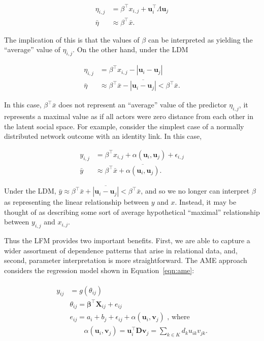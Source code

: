 \documentclass[12pt,twocolumn,twoside]{pnas-new}
\begin{document}
\begin{align*}
	\eta_{i,j} & =  \beta^\top x_{i,j} + \textbf{u}_{i}^{\top} \Lambda \textbf{u}_{j} \\
	\bar \eta & \approx  \beta^\top \bar x.
\end{align*}

The implication of this is that the values of $\beta$ can be interpreted as yielding the ``average'' value of $\eta_{i,j}$. On the other hand, under the LDM

\begin{align*}
	\eta_{i,j} & =  \beta^\top x_{i,j} - |\textbf{u}_{i} - \textbf{u}_{j}|  \\
	\bar \eta & \approx  \beta^\top \bar x - \overline{ |\textbf{u}_{i} - \textbf{u}_{j}| } <  \beta^\top \bar x .
\end{align*}

In this case, $\beta^\top \bar x$ does not represent an ``average'' value of the predictor $\eta_{i,j}$, it represents a maximal value as if all actors were zero distance from each other in the latent social space. For example, consider the simplest case of a normally distributed network  outcome with an identity link. In this case,

\begin{align*}
	y_{i,j} & = \beta^\top x_{i,j} + \alpha(\textbf{u}_{i}, \textbf{u}_{j}) + \epsilon_{i,j} \\
	\bar y & \approx \beta^\top \bar x + \overline{ \alpha(\textbf{u}_{i}, \textbf{u}_{j}) }   .
\end{align*}

Under the LDM, $\bar y \approx \beta^\top \bar x + \overline{ |\textbf{u}_{i} - \textbf{u}_{j}|  } < \beta^\top \bar x$, and so we no longer can interpret $\beta$ as representing the linear relationship between $y$ and $x$. Instead, it may be thought of as describing some sort of average hypothetical ``maximal'' relationship between $y_{i,j}$ and $x_{i,j}$.

Thus the LFM provides two important benefits. First, we are able to capture a wider assortment of dependence patterns that arise in relational data, and, second, parameter interpretation is more straightforward. The AME approach considers the regression model shown in Equation~\ref{eqn:ame}:

\begin{align}
\begin{aligned}
	y_{ij} &= g(\theta_{ij}) \\
	&\theta_{ij} = \bm\beta^{\top} \mathbf{X}_{ij} + e_{ij} \\
	&e_{ij} = a_{i} + b_{j}  + \epsilon_{ij} + \alpha(\textbf{u}_{i}, \textbf{v}_{j}) \text{  , where } \\
	&\qquad \alpha(\textbf{u}_{i}, \textbf{v}_{j}) = \textbf{u}_{i}^{\top} \textbf{D} \textbf{v}_{j} = \sum_{k \in K} d_{k} u_{ik} v_{jk}. \\
\label{eqn:ame}
\end{aligned}
\end{align}
\end{document}
